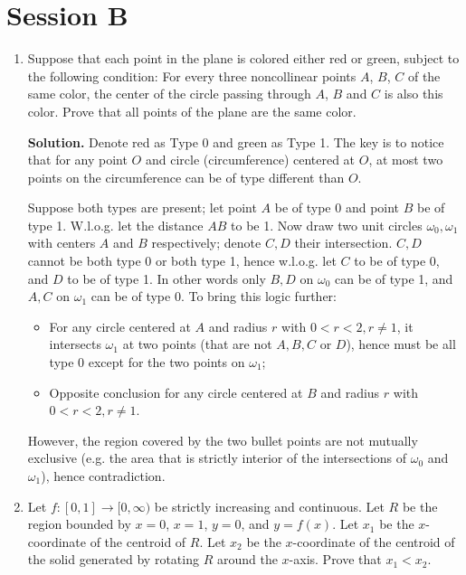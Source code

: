 \documentclass[11pt,a4paper]{article}
\begin{document}
    \section*{Session B}
    \begin{enumerate}
    	\item [B1.]
    	Suppose that each point in the plane is colored either red or green, subject to the following condition: For every three noncollinear points $A$, $B$, $C$ of the same color, the center of the circle passing through $A$, $B$ and $C$ is also this color. Prove that all points of the plane are the same color.
    	
    	\textbf{Solution.} 
    	Denote red as Type 0 and green as Type 1. The key is to notice that for any point $O$ and circle (circumference) centered at $O$, at most two points on the circumference can be of type different than $O$. 
    	
    	Suppose both types are present; let point $A$ be of type 0 and point $B$ be of type 1. W.l.o.g. let the distance $AB$ to be 1. Now draw two unit circles $\omega_0, \omega_1$ with centers $A$ and $B$ respectively; denote $C, D$ their intersection. 
    	$C, D$ cannot be both type 0 or both type 1, hence w.l.o.g. let $C$ to be of type 0, and $D$ to be of type 1. 
    	In other words only $B, D$ on $\omega_0$ can be of type 1, and $A, C$ on $\omega_1$ can be of type 0. 
    	To bring this logic further: 
    	\begin{itemize}
    		\item For any circle centered at $A$ and radius $r$ with $0<r<2, r\neq 1$, it intersects $\omega_1$ at two points (that are not $A, B, C$ or $D$), hence must be all type 0 except for the two points on $\omega_1$; 
    		\item Opposite conclusion for any circle centered at $B$ and radius $r$ with $0<r<2, r\neq 1$. 
    	\end{itemize}
        However, the region covered by the two bullet points are not mutually exclusive (e.g. the area that is strictly interior of the intersections of $\omega_0$ and $\omega_1$), hence contradiction. 
        
        \item[B2.] 
        Let $f \colon [0,1] \to [0,\infty)$ be strictly increasing and continuous. Let $R$ be the region bounded by $x=0$, $x=1$, $y=0$, and $y=f(x)$. Let $x_1$ be the $x$-coordinate of the centroid of $R$. Let $x_2$ be the $x$-coordinate of the centroid of the solid generated by rotating $R$ around the $x$-axis. Prove that $x_1<x_2$.
        

\end{enumerate}
\end{document}
